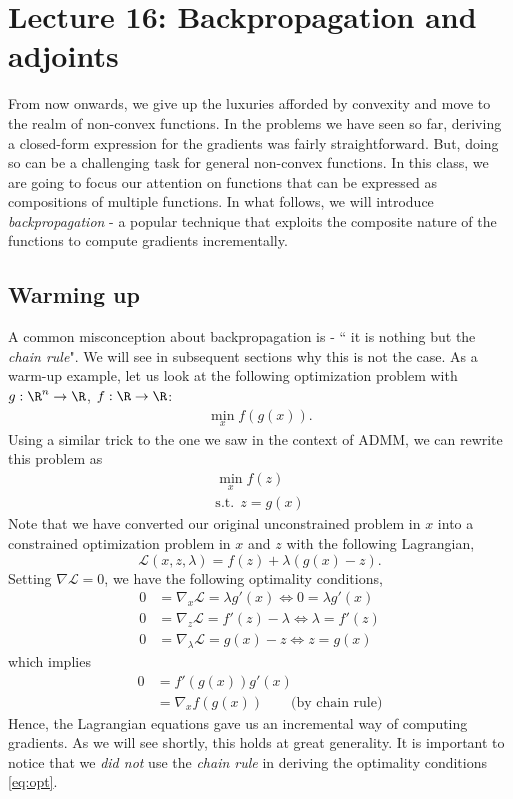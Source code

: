 \section{Lecture 16: Backpropagation and adjoints}
 From now onwards, we give up the luxuries afforded by convexity and move to the realm of non-convex functions. In the problems we have seen so far, deriving a closed-form expression for the gradients was fairly straightforward. But, doing so can be a challenging task for general non-convex functions. In this class, we are going to focus our attention on functions that can be expressed as compositions of multiple functions. In what follows, we will introduce \textit{backpropagation} - a popular technique that exploits the composite nature of the functions to compute gradients incrementally. 

\subsection{Warming up}
A common misconception about backpropagation is - `` it is nothing but the \textit{chain rule}". We will see in subsequent sections why this is not the case.  As a warm-up example, let us look at the following optimization problem with $g: \R^n \rightarrow \R$, $f: \R \rightarrow \R$:
\begin{align}
\min_{x} f(g(x)).
\end{align}
Using a similar trick to the one we saw in the context of ADMM, we can rewrite this problem as
\begin{align}
\min_{x} f(z) \\
\text{s.t.} \ \ z = g(x) \nonumber 
\end{align}
Note that we have converted our original unconstrained problem in $x$ into a constrained optimization problem in $x$ and $z$ with the following Lagrangian,
\begin{equation}
\mathcal{L} (x, z, \lambda) = f(z) + \lambda(g(x) - z).
\end{equation}
Setting $\nabla \mathcal{L} = 0$,  we have the following optimality conditions,
\begin{subequations}
\label{eq:opt}
\begin{align}
0 &= \nabla_x \mathcal{L} = \lambda g'(x) \Leftrightarrow 0 = \lambda g'(x) \label{eq:optx} \\
0 &= \nabla_z \mathcal{L} = f'(z) - \lambda \Leftrightarrow \lambda = f'(z) \label{eq:optz} \\
0 &= \nabla_{\lambda} \mathcal{L} = g(x) - z \Leftrightarrow z = g(x) \label{eq:optlambda}
\end{align}
\end{subequations}
which implies 
\begin{align}
0 &= f'(g(x))g'(x) \nonumber \\
&= \nabla_x f(g(x)) \nonumber \qquad \text{(by chain rule)} 
\end{align}
Hence, the Lagrangian equations gave us an incremental way of computing gradients. As we will see shortly, this holds at great generality. It is important to notice that we \textit{did not} use the \textit{chain rule} in deriving the optimality conditions \eqref{eq:opt}.

